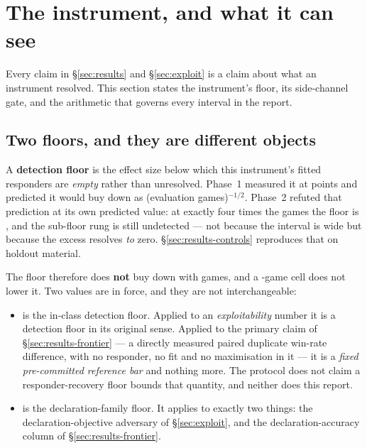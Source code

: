 \section{The instrument, and what it can see}
\label{sec:instrument}

Every claim in \S\ref{sec:results} and \S\ref{sec:exploit} is a claim about what an instrument
resolved. This section states the instrument's floor, its side-channel gate, and the arithmetic that
governs every interval in the report.

\subsection{Two floors, and they are different objects}
\label{sec:instrument-floor}

A \textbf{detection floor} is the effect size below which this instrument's fitted responders are
\emph{empty} rather than unresolved. Phase~1 measured it at \vsevenFloorPhaseOne{} points and
predicted it would buy down as (evaluation games)$^{-1/2}$. Phase~2 refuted that prediction at its own
predicted value: at exactly four times the games the floor is \vsevenPrimaryFloor{}, and the
sub-floor rung is still undetected --- not because the interval is wide but because the excess
resolves \emph{to} zero. \S\ref{sec:results-controls} reproduces that on holdout material.

The floor therefore does \textbf{not} buy down with games, and a \vsevenBestExploitN{}-game cell does not lower it.
Two values are in force, and they are not interchangeable:

\begin{itemize}
\item \textbf{\vsevenPrimaryFloor{}} is the in-class detection floor. Applied to an
  \emph{exploitability} number it is a detection floor in its original sense. Applied to the primary
  claim of \S\ref{sec:results-frontier} --- a directly measured paired duplicate win-rate difference,
  with no responder, no fit and no maximisation in it --- it is a \emph{fixed pre-committed reference
  bar} and nothing more. The protocol does not claim a responder-recovery floor bounds that quantity,
  and neither does this report.
\item \textbf{\vsevenDeclFloor{}} is the declaration-family floor. It applies to exactly two things:
  the declaration-objective adversary of \S\ref{sec:exploit}, and the declaration-accuracy column of
  \S\ref{sec:results-frontier}.
\end{itemize}

